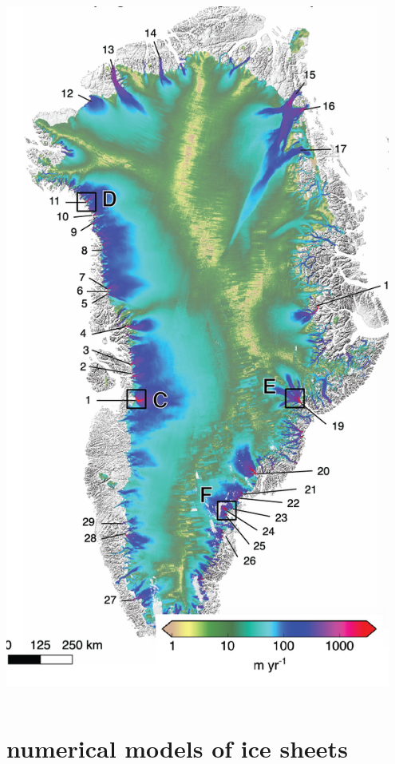 \documentclass[hide notes,intlimits]{beamer}
\begin{document}
\begin{frame}
\begin{columns}
\begin{column}{0.4\textwidth}
\hfill \includegraphics[width=0.95\textwidth]{greenland-overview-obsonly}
\end{column}
\end{columns}
\end{frame}


\section[numerical models]{numerical models of ice sheets}
\end{document}

